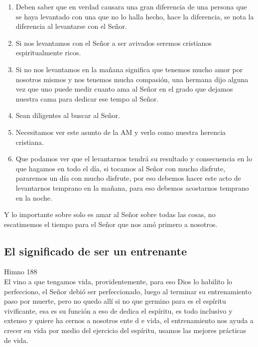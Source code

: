 \documentclass[12pt]{article}
\begin{document}
\begin{enumerate}
\item Deben saber que en verdad causara una gran diferencia de una persona que se haya levantado con una que no lo halla hecho, hace la diferencia, se nota la diferencia al levantarse con el Señor.

\item Si nos levantamos con el Señor a ser avivados seremos cristianos espiritualmente ricos.

\item Si no nos levantamos en la mañana significa que tenemos mucho amor por nosotros mismos y nos tenemos mucha compasión, una hermana dijo alguna vez que uno puede medir cuanto ama al Señor en el grado que dejamos nuestra cama para dedicar ese tempo al Señor.

\item Sean diligentes al buscar al Señor.

\item Necesitamos ver este asunto de la AM y verlo como nuestra herencia cristiana.

\item Que podamos ver que el levantarnos tendrá su resultado y consecuencia en lo que hagamos en todo el día, si tocamos al Señor con mucho disfrute, pararemos un día con mucho disfrute,  por eso debemos hacer este acto de levantarnos temprano en la mañana, para eso debemos acostarnos temprano en la noche.

\end{enumerate}

Y lo importante sobre solo es amar al Señor sobre todas las cosas, no escatimemos el tiempo para el Señor que nos amó primero a nosotros.\\

\subsection*{El significado de ser un entrenante}

Himno 188\\

El vino a que tengamos vida, providentemente, para eso Dios lo habilito lo perfecciono, el Señor debió ser perfeccionado, luego al terminar su entrenamiento paso por muerte, pero no quedo allí si no que germino para es el espíritu vivificante, esa es su función a eso de dedica el espíritu, es todo inclusivo y extenso y quiere ha cernos a nosotros ente d e vida, el entrenamiento nos ayuda a crecer en vida por medio del ejercicio del espíritu, usamos las mejores prácticas de vida.\\
\end{document}
